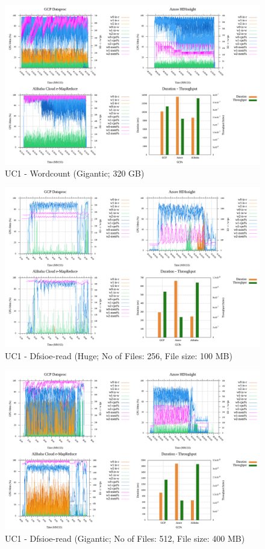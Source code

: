 \documentclass[review]{elsarticle}
\begin{document}
\begin{figure}[b]
	\includegraphics[width=\textwidth]{uc1-wrdcnt-g-cmidt}
	\caption{UC1 - Wordcount (Gigantic; 320 GB)}
	\label{fig:uc1-wrdcnt-g-cmidt}
	\centering
\end{figure}

\begin{figure}[b]
	\includegraphics[width=\textwidth]{uc1-dfsioer-h-cmidt}
	\caption{UC1 - Dfsioe-read (Huge; No of Files: 256, File size: 100 MB)}
	\label{fig:uc1-dfsioer-h-cmidt}
	\centering
\end{figure}

\begin{figure}[b]
	\includegraphics[width=\textwidth]{uc1-dfsioer-g-cmidt}
	\caption{UC1 - Dfsioe-read (Gigantic; No of Files: 512, File size: 400 MB)}
	\label{fig:uc1-dfsioer-g-cmidt}
	\centering
\end{figure}
\end{document}
